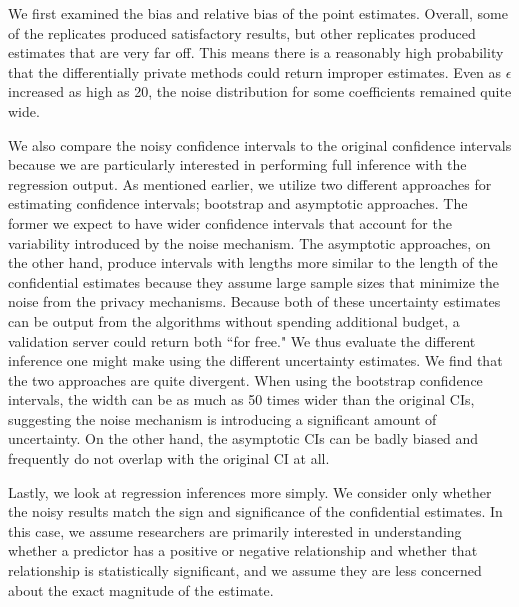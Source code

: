 We first examined the bias and relative bias of the point estimates. Overall, some of the replicates produced satisfactory results, but other replicates produced estimates that are very far off. This means there is a reasonably high probability that the differentially private methods could return improper estimates. Even as $\epsilon$ increased as high as 20, the noise distribution for some coefficients remained quite wide.

We also compare the noisy confidence intervals to the original confidence intervals because we are particularly interested in performing full inference with the regression output. As mentioned earlier, we utilize two different approaches for estimating confidence intervals; bootstrap and asymptotic approaches. The former we expect to have wider confidence intervals that account for the variability introduced by the noise mechanism. The asymptotic approaches, on the other hand, produce intervals with lengths more similar to the length of the confidential estimates because they assume large sample sizes that minimize the noise from the privacy mechanisms. Because both of these uncertainty estimates can be output from the algorithms without spending additional budget, a validation server could return both ``for free." We thus evaluate the different inference one might make using the different uncertainty estimates. We find that the two approaches are quite divergent. When using the bootstrap confidence intervals, the width can be as much as 50 times wider than the original CIs, suggesting the noise mechanism is introducing a significant amount of uncertainty. On the other hand, the asymptotic CIs can be badly biased and frequently do not overlap with the original CI at all.

Lastly, we look at regression inferences more simply. We consider only whether the noisy results match the sign and significance of the confidential estimates. In this case, we assume researchers are primarily interested in understanding whether a predictor has a positive or negative relationship and whether that relationship is statistically significant, and we assume they are less concerned about the exact magnitude of the estimate.

